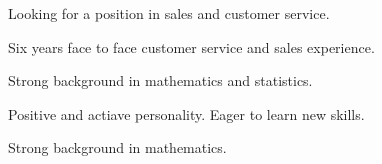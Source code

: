 

\begin{cventries}

  \cventry
    {} %
    {} %
    {} %
    {} %
    {
      \begin{cvitems} %
      \item Looking for a position in sales and customer service.
      \item Six years face to face customer service and sales experience.
      \item Strong background in mathematics and statistics.
      \item Positive and actiave personality.  Eager to learn new skills.
      \item Strong background in mathematics.
      \end{cvitems}
    }


\end{cventries}
